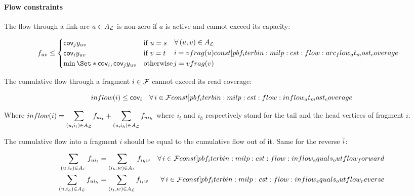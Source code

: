 \paragraph{Flow constraints}

The flow through a link-arc \(a \in A_{\mathcal{L}}{}\) is non-zero if \(a\) is active and cannot exceed its capacity:
\begin{Constraint}
  \begin{align}
    f_{uv} \leq
    \begin{cases}
      \cov{j} y_{uv} & \text{if \(u = s\)} \\
      \cov{i} y_{uv} & \text{if \(v = t\)} \\
      \min\Set*{\cov{i}, \cov{j}} y_{uv} & \text{otherwise}
    \end{cases} &
    \begin{split}
      \forall (u, v) \in A_\Links{} \\
      i = vfrag(u) \\
      j = vfrag(v)
    \end{split} \cstlabel{pbf_iterbin:milp:cst:flow:arc_flow_at_most_coverage} %
  \end{align}
\end{Constraint}

The cumulative flow through a fragment \(i \in \mathcal{F}{}\) cannot exceed its read coverage:
\begin{Constraint}
  \begin{equation}
    inflow(i) \leq \cov{i} \quad \forall i \in \Fragments{} \cstlabel{pbf_iterbin:milp:cst:flow:inflow_at_most_coverage} %
  \end{equation}
\end{Constraint}
Where \(\displaystyle inflow(i) = \sum_{(u, i_t) \in A_{\mathcal{L}}{}} f_{ui_t} + \sum_{(u, i_h) \in A_{\mathcal{L}}{}} f_{ui_h}\) where \(i_t\) and \(i_h\) respectively stand for the tail and the head vertices of fragment \(i\).

The cumulative flow into a fragment \(i\) should be equal to the cumulative flow out of it. Same for the reverse \(\overline{i}\):
\begin{Constraint}
  \begin{align}
    \sum_{(u, i_t) \in A_\Links{}} f_{u i_t} & = \sum_{(i_h, w) \in A_\Links{}} f_{i_h w} & \forall i \in \Fragments{} \cstlabel{pbf_iterbin:milp:cst:flow:inflow_equals_outflow_forward} \\ %
    \sum_{(u, i_h) \in A_\Links{}} f_{u i_h} & = \sum_{(i_t, w) \in A_\Links{}} f_{i_t w} & \forall i \in \Fragments{} \cstlabel{pbf_iterbin:milp:cst:flow:inflow_equals_outflow_reverse} %
  \end{align}
\end{Constraint}

